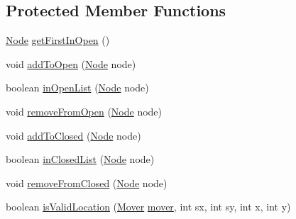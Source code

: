 \subsection*{Protected Member Functions}
\begin{DoxyCompactItemize}
\item 
\mbox{\hyperlink{classorg_1_1newdawn_1_1slick_1_1util_1_1pathfinding_1_1_a_star_path_finder_1_1_node}{Node}} \mbox{\hyperlink{classorg_1_1newdawn_1_1slick_1_1util_1_1pathfinding_1_1_a_star_path_finder_acb31149ddbceaa1f0b23f211e113a54e}{get\+First\+In\+Open}} ()
\item 
void \mbox{\hyperlink{classorg_1_1newdawn_1_1slick_1_1util_1_1pathfinding_1_1_a_star_path_finder_a412da764ea584cd8c7f6ae35c5a00314}{add\+To\+Open}} (\mbox{\hyperlink{classorg_1_1newdawn_1_1slick_1_1util_1_1pathfinding_1_1_a_star_path_finder_1_1_node}{Node}} node)
\item 
boolean \mbox{\hyperlink{classorg_1_1newdawn_1_1slick_1_1util_1_1pathfinding_1_1_a_star_path_finder_a8f95ed1da36dc1963067306788b2f2de}{in\+Open\+List}} (\mbox{\hyperlink{classorg_1_1newdawn_1_1slick_1_1util_1_1pathfinding_1_1_a_star_path_finder_1_1_node}{Node}} node)
\item 
void \mbox{\hyperlink{classorg_1_1newdawn_1_1slick_1_1util_1_1pathfinding_1_1_a_star_path_finder_a3efb779275ef97f7e5dc164be0488c08}{remove\+From\+Open}} (\mbox{\hyperlink{classorg_1_1newdawn_1_1slick_1_1util_1_1pathfinding_1_1_a_star_path_finder_1_1_node}{Node}} node)
\item 
void \mbox{\hyperlink{classorg_1_1newdawn_1_1slick_1_1util_1_1pathfinding_1_1_a_star_path_finder_a7978ff6c8e01fd6b55650f9eff9723ed}{add\+To\+Closed}} (\mbox{\hyperlink{classorg_1_1newdawn_1_1slick_1_1util_1_1pathfinding_1_1_a_star_path_finder_1_1_node}{Node}} node)
\item 
boolean \mbox{\hyperlink{classorg_1_1newdawn_1_1slick_1_1util_1_1pathfinding_1_1_a_star_path_finder_ad6b6d659cea8c18e998fd25080e902de}{in\+Closed\+List}} (\mbox{\hyperlink{classorg_1_1newdawn_1_1slick_1_1util_1_1pathfinding_1_1_a_star_path_finder_1_1_node}{Node}} node)
\item 
void \mbox{\hyperlink{classorg_1_1newdawn_1_1slick_1_1util_1_1pathfinding_1_1_a_star_path_finder_a7e61b3a937550a5ea0bc7901c9509d8f}{remove\+From\+Closed}} (\mbox{\hyperlink{classorg_1_1newdawn_1_1slick_1_1util_1_1pathfinding_1_1_a_star_path_finder_1_1_node}{Node}} node)
\item 
boolean \mbox{\hyperlink{classorg_1_1newdawn_1_1slick_1_1util_1_1pathfinding_1_1_a_star_path_finder_a815e6ff04646c49e3d0bacc2d06ee069}{is\+Valid\+Location}} (\mbox{\hyperlink{interfaceorg_1_1newdawn_1_1slick_1_1util_1_1pathfinding_1_1_mover}{Mover}} \mbox{\hyperlink{classorg_1_1newdawn_1_1slick_1_1util_1_1pathfinding_1_1_a_star_path_finder_a5407fe31e264f03e9d6092bcb18aba4a}{mover}}, int sx, int sy, int x, int y)
\end{DoxyCompactItemize}
